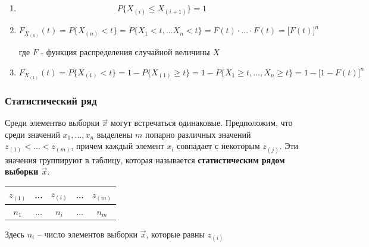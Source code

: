 \begin{note}
    \begin{enumerate}
        \item
            \begin{equation*}
                P\{ X_{(i)} \le X_{(i+1)} \} = 1
            \end{equation*}

        \item
            \begin{equation*}
                F_{X_{(n)}}(t) = P\{ X_{(n)} < t \} = P\{ X_1 < t,... X_n < t \} = F(t) \cdot ... \cdot F(t) = \big[ F(t) \big]^n
            \end{equation*}

            где $F$ - функция распределения случайной величины $X$

        \item
            \begin{equation*}
                F_{X_(1)}(t) = P\{ X_{(1)} < t \} = 1 - P\{ X_{(1)} \geq t \} = 1 - P\{ X_1 \geq t, ..., X_n \geq t\} = 1 - \big[ 1 - F(t) \big]^n
            \end{equation*}
    \end{enumerate}
\end{note}

\subsubsection{Статистический ряд}

Среди элементво выборки $\vec x$ могут встречаться одинаковые.
Предположим, что среди значений $x_1, ..., x_n$ выделены $m$
попарно различных значений $z_{(1)} < ... < z_{(m)}$, причем
каждый элемент $x_i$ совпадает с некоторым
$z_{(j)}$. Эти значения группируют в таблицу, которая называется
\textbf{статистическим рядом выборки $\vec x$}.

\begin{table}[H]
    \centering
    \begin{tabular}{|c|c|c|c|c|}
        \hline
        $z_{(1)}$ & ... & $z_{(i)}$ & ... & $z_{(m)}$ \\
        \hline
        $n_1$ & ... & $n_i$ & ... & $n_m$ \\
        \hline
    \end{tabular}
\end{table}

Здесь $n_i$ -- число элементов выборки $\vec x$, которые равны
$z_{(i)}$

